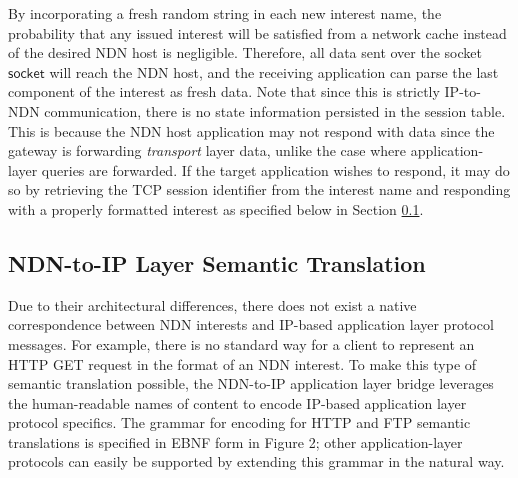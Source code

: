 %
By incorporating a fresh random string in each new interest name, the probability that any issued interest will be satisfied from a network cache instead of the desired NDN host is negligible. Therefore, all data sent over the socket $\mathsf{socket}$ will reach the NDN host, and the receiving application can parse the last component of the interest as fresh data. Note that since this is strictly IP-to-NDN communication, there is no state information persisted in the session table. This is because the NDN host application may not respond with data since the gateway is forwarding \emph{transport} layer data, unlike the case where application-layer queries are forwarded. If the target application wishes to respond, it may do so by retrieving the TCP session identifier from the interest name and responding with a properly formatted interest as specified below in Section \ref{sec:ndn-to-ip}.


\subsection{NDN-to-IP Layer Semantic Translation}\label{sec:ndn-to-ip}
Due to their architectural differences, there does not exist a native correspondence between NDN interests and IP-based application layer protocol messages. For example, there is no standard way for a client to represent an HTTP GET request in the format of an NDN interest. To make this type of semantic translation possible, the NDN-to-IP application layer bridge leverages the human-readable names of content to encode IP-based application layer protocol specifics. The grammar for encoding for HTTP and FTP semantic translations is specified in EBNF form in Figure 2; other application-layer protocols can easily be supported by extending this grammar in the natural way.


